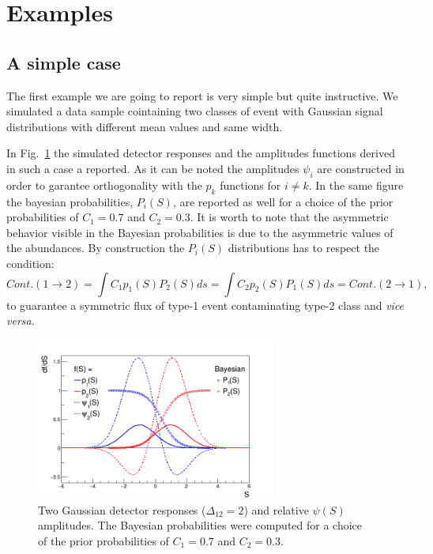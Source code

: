 \section{Examples}
\subsection{A simple case}
The first example we are going to report is very simple but quite instructive.
We simulated a data sample cointaining two classes of event with Gaussian
signal distributions with different mean values and same width.

In Fig.~\ref{fig:Gaus2} the simulated detector responses and the amplitudes
functions derived in such a case a reported. As it can be noted the amplitudes
$\psi_{i}$ are constructed in order to garantee orthogonality with the $p_{k}$
functions for $i \neq k$. In the same figure the bayesian probabilities,
$P_{i}(S)$, are reported as well for a choice of the prior probabilities of
$C_{1}=0.7$ and $C_{2}=0.3$. It is worth to note that the asymmetric behavior
visible in the Bayesian probabilities is due to the asymmetric values of the
abundances. By construction the $P_{i}(S)$ distributions has to respect the
condition:
\begin{equation} 
\label{Sec3:BayesCond}
Cont. (1\rightarrow 2) = \int C_{1} p_{1}(S) P_{2}(S) ds = \int
C_{2} p_{2}(S) P_{1}(S) ds = Cont. (2\rightarrow 1),
\end{equation}
to guarantee a symmetric flux of type-1 event contaminating type-2 class and 
{\it vice versa}.

\begin{figure}[!htb]
\centering
\includegraphics[width=0.7\textwidth]{../png/figGaus2.png}
\caption{Two Gaussian detector responses ($\Delta_{12} = 2$) and relative
  $\psi(S)$ amplitudes. The Bayesian probabilities were computed for a choice
  of the prior probabilities of $C_{1}=0.7$ and $C_{2}=0.3$.}
\label{fig:Gaus2}
\end{figure}


